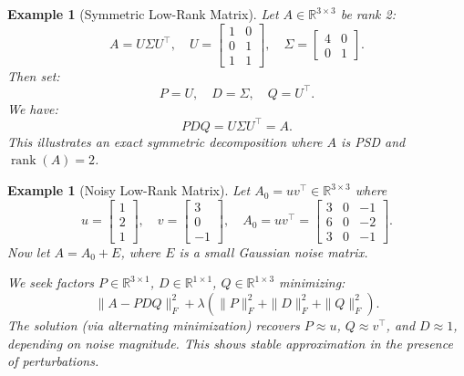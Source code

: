 \documentclass[10pt,a4paper]{article}
\newtheorem{example}[theorem]{\bf Example}
\begin{document}
\begin{example}[Symmetric Low-Rank Matrix]
Let $A \in \mathbb{R}^{3 \times 3}$ be rank 2:
\[
A = U \Sigma U^\top, \quad
U = \begin{bmatrix}
1 & 0 \\
0 & 1 \\
1 & 1
\end{bmatrix}, \quad
\Sigma = \begin{bmatrix}
4 & 0 \\
0 & 1
\end{bmatrix}.
\]
Then set:
\[
P = U, \quad D = \Sigma, \quad Q = U^\top.
\]
We have:
\[
PDQ = U \Sigma U^\top = A.
\]
This illustrates an exact symmetric decomposition where $A$ is PSD and $\operatorname{rank}(A) = 2$.
\end{example}
\begin{example}[Noisy Low-Rank Matrix]
Let $A_0 = uv^\top \in \mathbb{R}^{3 \times 3}$ where
\[
u = \begin{bmatrix} 1 \\ 2 \\ 1 \end{bmatrix}, \quad
v = \begin{bmatrix} 3 \\ 0 \\ -1 \end{bmatrix}, \quad
A_0 = u v^\top = 
\begin{bmatrix}
3 & 0 & -1 \\
6 & 0 & -2 \\
3 & 0 & -1
\end{bmatrix}.
\]
Now let $A = A_0 + E$, where $E$ is a small Gaussian noise matrix.

We seek factors $P \in \mathbb{R}^{3 \times 1}$, $D \in \mathbb{R}^{1 \times 1}$, $Q \in \mathbb{R}^{1 \times 3}$ minimizing:
\[
\|A - PDQ\|_F^2 + \lambda (\|P\|_F^2 + \|D\|_F^2 + \|Q\|_F^2).
\]
The solution (via alternating minimization) recovers $P \approx u$, $Q \approx v^\top$, and $D \approx 1$, depending on noise magnitude. This shows stable approximation in the presence of perturbations.
\end{example}
\end{document}
